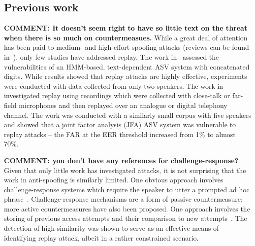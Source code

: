 \subsection{Previous work}

{\bfseries COMMENT: It doesn't seem right to have so little text on the threat when there is so much on countermeasues.}
While a great deal of attention has been paid to medium- and high-effort spoofing attacks (reviews can be found in~\cite{handbookChapter,specComJournal}), only few studies have addressed replay.  
The work in~\cite{Lindberg1999} assessed the vulnerabilities of an HMM-based, text-dependent ASV system with concatenated digits.  
While results showed that replay attacks are highly effective, experiments were conducted with data collected from only two speakers.
The work in~\cite{Villalba2010} investigated replay using recordings which were collected with close-talk or far-field microphones and then replayed over an analogue or digital telephony channel. 
The work was conducted with a similarly small corpus with five speakers and showed that a joint factor analysis (JFA) ASV system was vulnerable to replay attacks -- the FAR at the EER threshold increased from 1\% to almost 70\%. 


{\bfseries COMMENT: you don't have any references for challenge-response?}
Given that only little work has investigated attacks, it is not surprising that the work in anti-spoofing is similarly limited.  
One obvious approach involves challenge-response systems which require the speaker to utter a prompted ad hoc phrase~\cite{???}. 
Challenge-response mechanisms are a form of passive countermeasure; more active countermeasures have also been proposed.
One approach involves the storing of previous access attempts and their comparison to new attempts~\cite{Shang2010}. 
The detection of high similarity was shown to serve as an effective means of identifying replay attack, albeit in a rather constrained scenario.

